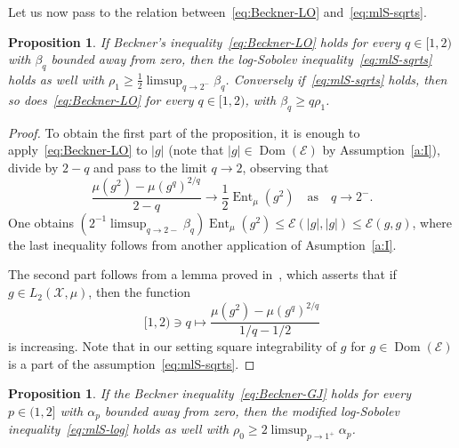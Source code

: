 \documentclass[a4paper]{amsart}
\newtheorem{proposition}[theorem]{Proposition} %
\theoremstyle{definition}
\theoremstyle{remark}
\numberwithin{equation}{section}
\newcommand{\calX}{\mathcal{X}}
\DeclareMathOperator{\Dom}{Dom} %
\newcommand*{\calE}{\mathcal{E}}
\DeclareMathOperator{\Ent}{Ent}	%
\begin{document}
Let us now pass to the relation between~\eqref{eq:Beckner-LO} and~\eqref{eq:mlS-sqrts}.

\begin{proposition}
If Beckner's inequality~\eqref{eq:Beckner-LO} holds for every $q\in[1,2)$ with $\beta_q$ bounded away from zero, then the log-Sobolev inequality~\eqref{eq:mlS-sqrts} holds as well with $\rho_1 \geq \frac{1}{2}\limsup_{q\to 2^-}\beta_q$. Conversely if~\eqref{eq:mlS-sqrts} holds, then so does~\eqref{eq:Beckner-LO} for every $q \in [1,2)$, with $\beta_q \ge q\rho_1$.
\end{proposition}

\begin{proof}To obtain the first part of the proposition, it is enough to apply~\eqref{eq:Beckner-LO} to $|g|$ (note that $|g| \in \Dom(\calE)$ by Assumption~\ref{a:I}), divide by $2-q$ and pass to the limit $q\to 2$, observing that
\[
  \frac{\mu(g^2) - \mu(g^q)^{2/q}}{2-q}   \longrightarrow \frac{1}{2}\Ent_\mu(g^2)
  \quad\text{as}\quad q\to 2^-.
  \]
One obtains $(2^{-1}\limsup_{q\to 2-} \beta_q)\Ent_\mu (g^2) \le \calE(|g|,|g|) \le \calE(g,g)$, where the last inequality follows from another application of Asumption~\ref{a:I}.

The second part follows from a lemma proved in~\cite{MR1796718}, which asserts that if $g \in L_2(\calX,\mu)$, then
the function
\[
 [1,2)\ni q \longmapsto  \frac{\mu(g^2) - \mu(g^q)^{2/q}}{1/q-1/2}
\]
is increasing.
Note that in our setting square integrability of $g$ for $g \in \Dom(\calE)$ is a part of the assumption~\eqref{eq:mlS-sqrts}.
\end{proof}

\begin{proposition}
If the Beckner inequality~\eqref{eq:Beckner-GJ} holds for every $p\in(1,2]$ with $\alpha_p$ bounded away from zero, then the modified log-Sobolev inequality~\eqref{eq:mlS-log} holds as well with $\rho_0 \geq 2\limsup_{p\to 1^+}\alpha_p$.
\end{proposition}
\end{document}
